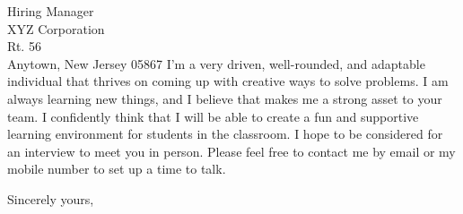 \documentclass{letter}
\begin{document}
\begin{letter}{Hiring Manager \\
XYZ Corporation \\
Rt. 56 \\
Anytown, New Jersey 05867}
\noindent I’m a very driven, well-rounded, and adaptable individual that thrives on coming up with creative ways to solve problems. I am always learning new things, and I believe that makes me a strong asset to your team. I confidently think that I will be able to create a fun and supportive learning environment for students in the classroom. I hope to be considered for an interview to meet you in person. Please feel free to contact me by email or my mobile number to set up a time to talk.

\closing{Sincerely yours,}


\end{letter}
\end{document}
